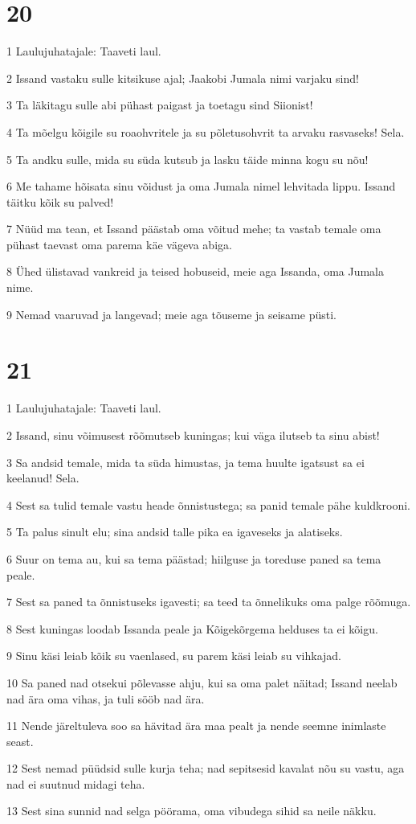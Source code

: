 \chapter{20}

\par 1 Laulujuhatajale: Taaveti laul.
\par 2 Issand vastaku sulle kitsikuse ajal; Jaakobi Jumala nimi varjaku sind!
\par 3 Ta läkitagu sulle abi pühast paigast ja toetagu sind Siionist!
\par 4 Ta mõelgu kõigile su roaohvritele ja su põletusohvrit ta arvaku rasvaseks! Sela.
\par 5 Ta andku sulle, mida su süda kutsub ja lasku täide minna kogu su nõu!
\par 6 Me tahame hõisata sinu võidust ja oma Jumala nimel lehvitada lippu. Issand täitku kõik su palved!
\par 7 Nüüd ma tean, et Issand päästab oma võitud mehe; ta vastab temale oma pühast taevast oma parema käe vägeva abiga.
\par 8 Ühed ülistavad vankreid ja teised hobuseid, meie aga Issanda, oma Jumala nime.
\par 9 Nemad vaaruvad ja langevad; meie aga tõuseme ja seisame püsti.

\chapter{21}

\par 1 Laulujuhatajale: Taaveti laul.
\par 2 Issand, sinu võimusest rõõmutseb kuningas; kui väga ilutseb ta sinu abist!
\par 3 Sa andsid temale, mida ta süda himustas, ja tema huulte igatsust sa ei keelanud! Sela.
\par 4 Sest sa tulid temale vastu heade õnnistustega; sa panid temale pähe kuldkrooni.
\par 5 Ta palus sinult elu; sina andsid talle pika ea igaveseks ja alatiseks.
\par 6 Suur on tema au, kui sa tema päästad; hiilguse ja toreduse paned sa tema peale.
\par 7 Sest sa paned ta õnnistuseks igavesti; sa teed ta õnnelikuks oma palge rõõmuga.
\par 8 Sest kuningas loodab Issanda peale ja Kõigekõrgema helduses ta ei kõigu.
\par 9 Sinu käsi leiab kõik su vaenlased, su parem käsi leiab su vihkajad.
\par 10 Sa paned nad otsekui põlevasse ahju, kui sa oma palet näitad; Issand neelab nad ära oma vihas, ja tuli sööb nad ära.
\par 11 Nende järeltuleva soo sa hävitad ära maa pealt ja nende seemne inimlaste seast.
\par 12 Sest nemad püüdsid sulle kurja teha; nad sepitsesid kavalat nõu su vastu, aga nad ei suutnud midagi teha.
\par 13 Sest sina sunnid nad selga pöörama, oma vibudega sihid sa neile näkku.

